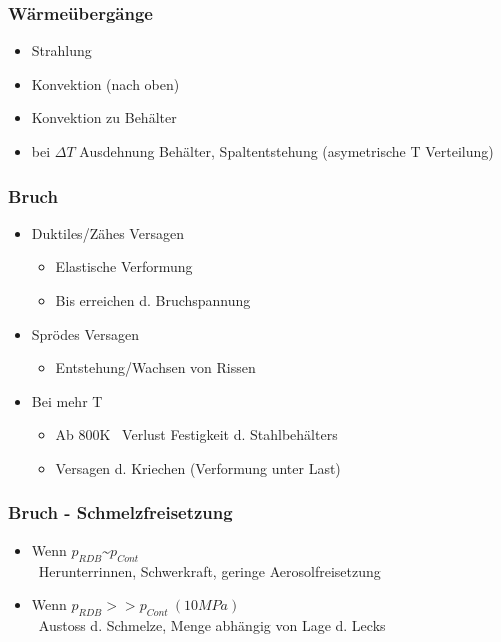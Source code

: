 \documentclass[12pt]{article}
\begin{document}
\subsubsection{Wärmeübergänge}
\begin{itemize}[noitemsep]
	\item Strahlung
	\item Konvektion (nach oben)
	\item Konvektion zu Behälter
	\item bei \(\Delta T\) Ausdehnung Behälter, Spaltentstehung (asymetrische T Verteilung)
\end{itemize}

\subsubsection{Bruch}
\begin{itemize}[noitemsep]
	\item Duktiles/Zähes Versagen
		\begin{itemize}[noitemsep]
			\item Elastische Verformung
			\item Bis erreichen d. Bruchspannung
		\end{itemize}
	\item Sprödes Versagen
		\begin{itemize}[noitemsep]
			\item Entstehung/Wachsen von Rissen
		\end{itemize}
	\item Bei mehr T
		\begin{itemize}[noitemsep]
			\item Ab 800K \textrightarrow\ Verlust Festigkeit d. Stahlbehälters
			\item Versagen d. Kriechen (Verformung unter Last)
		\end{itemize}
\end{itemize}

\subsubsection{Bruch - Schmelzfreisetzung}
\begin{itemize}[noitemsep]
	\item Wenn \(p_{RDB} \text{\textasciitilde} p_{Cont}\)\\
		\textrightarrow\ Herunterrinnen, Schwerkraft, geringe Aerosolfreisetzung
	\item Wenn \(p_{RDB} >> p_{Cont}\ (10MPa)\)\\
		\textrightarrow\ Austoss d. Schmelze, Menge abhängig von Lage d. Lecks
\end{itemize}
\end{document}
